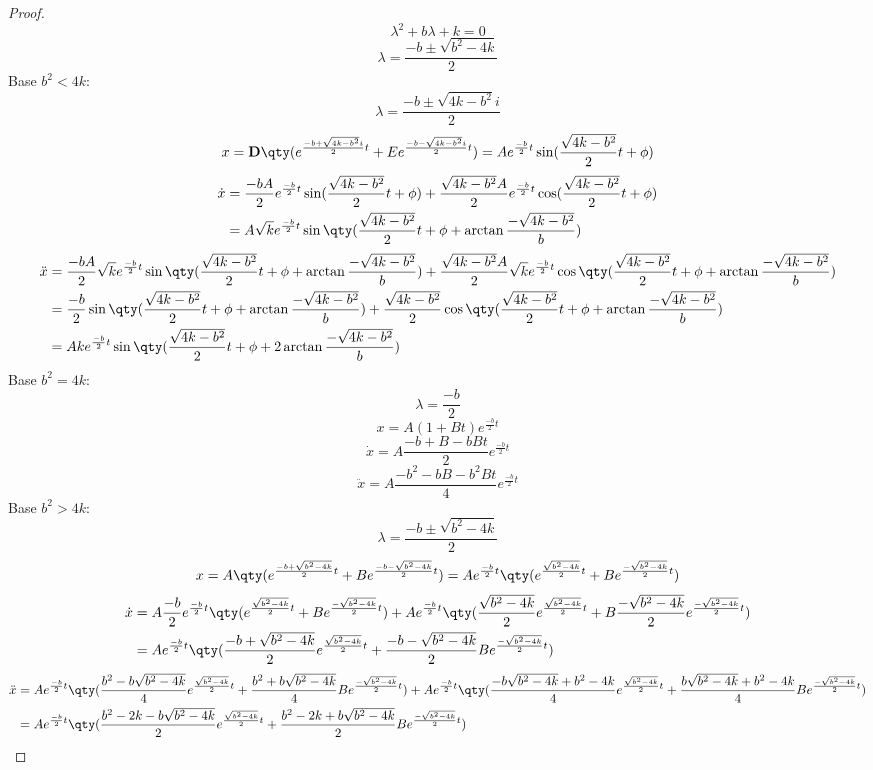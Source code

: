 \documentclass[a4paper,12pt]{article}
\begin{document}
\begin{proof}
\[\lambda^2+b\lambda+k=0\]
\[\lambda=\frac{-b\pm\sqrt{b^2-4k}}{2}\]
Base $b^2<4k$:
\[\lambda=\frac{-b\pm\sqrt{4k-b^2}i}{2}\]
\[x=\mathbf{D}\qty(e^{\frac{-b+\sqrt{4k-b^2}i}{2}t}+Ee^{\frac{-b-\sqrt{4k-b^2}i}{2}t})=Ae^{\frac{-b}{2}t}\sin(\frac{\sqrt{4k-b^2}}{2}t+\phi)\]
\[\begin{aligned}
\dot{x}&=\frac{-bA}{2}e^{\frac{-b}{2}t}\sin(\frac{\sqrt{4k-b^2}}{2}t+\phi)+\frac{\sqrt{4k-b^2}A}{2}e^{\frac{-b}{2}t}\cos(\frac{\sqrt{4k-b^2}}{2}t+\phi)\\
&=A\sqrt{k}e^{\frac{-b}{2}t}\sin\qty(\frac{\sqrt{4k-b^2}}{2}t+\phi+\arctan\frac{-\sqrt{4k-b^2}}{b})
\end{aligned}\]
\[\begin{aligned}
\ddot{x}&=\frac{-bA}{2}\sqrt{k}e^{\frac{-b}{2}t}\sin\qty(\frac{\sqrt{4k-b^2}}{2}t+\phi+\arctan\frac{-\sqrt{4k-b^2}}{b})+\frac{\sqrt{4k-b^2}A}{2}\sqrt{k}e^{\frac{-b}{2}t}\cos\qty(\frac{\sqrt{4k-b^2}}{2}t+\phi+\arctan\frac{-\sqrt{4k-b^2}}{b})\\
&=\frac{-b}{2}\sin\qty(\frac{\sqrt{4k-b^2}}{2}t+\phi+\arctan\frac{-\sqrt{4k-b^2}}{b})+\frac{\sqrt{4k-b^2}}{2}\cos\qty(\frac{\sqrt{4k-b^2}}{2}t+\phi+\arctan\frac{-\sqrt{4k-b^2}}{b})\\
&=Ake^{\frac{-b}{2}t}\sin\qty(\frac{\sqrt{4k-b^2}}{2}t+\phi+2\arctan\frac{-\sqrt{4k-b^2}}{b})
\end{aligned}\]
Base $b^2=4k$:
\[\lambda=\frac{-b}{2}\]
\[x=A(1+Bt)e^{\frac{-b}{2}t}\]
\[\dot{x}=A\frac{-b+B-bBt}{2}e^{\frac{-b}{2}t}\]
\[\ddot{x}=A\frac{-b^2-bB-b^2Bt}{4}e^{\frac{-b}{2}t}\]
Base $b^2>4k$:
\[\lambda=\frac{-b\pm\sqrt{b^2-4k}}{2}\]
\[x=A\qty(e^{\frac{-b+\sqrt{b^2-4k}}{2}t}+Be^{\frac{-b-\sqrt{b^2-4k}}{2}t})=Ae^{\frac{-b}{2}t}\qty(e^{\frac{\sqrt{b^2-4k}}{2}t}+Be^{\frac{-\sqrt{b^2-4k}}{2}t})\]
\[\begin{aligned}
\dot{x}&=A\frac{-b}{2}e^{\frac{-b}{2}t}\qty(e^{\frac{\sqrt{b^2-4k}}{2}t}+Be^{\frac{-\sqrt{b^2-4k}}{2}t})+Ae^{\frac{-b}{2}t}\qty(\frac{\sqrt{b^2-4k}}{2}e^{\frac{\sqrt{b^2-4k}}{2}t}+B\frac{-\sqrt{b^2-4k}}{2}e^{\frac{-\sqrt{b^2-4k}}{2}t})\\
&=Ae^{\frac{-b}{2}t}\qty(\frac{-b+\sqrt{b^2-4k}}{2}e^{\frac{\sqrt{b^2-4k}}{2}t}+\frac{-b-\sqrt{b^2-4k}}{2}Be^{\frac{-\sqrt{b^2-4k}}{2}t})
\end{aligned}\]
\[\begin{aligned}
\ddot{x}&=Ae^{\frac{-b}{2}t}\qty(\frac{b^2-b\sqrt{b^2-4k}}{4}e^{\frac{\sqrt{b^2-4k}}{2}t}+\frac{b^2+b\sqrt{b^2-4k}}{4}Be^{\frac{-\sqrt{b^2-4k}}{2}t})+Ae^{\frac{-b}{2}t}\qty(\frac{-b\sqrt{b^2-4k}+b^2-4k}{4}e^{\frac{\sqrt{b^2-4k}}{2}t}+\frac{b\sqrt{b^2-4k}+b^2-4k}{4}Be^{\frac{-\sqrt{b^2-4k}}{2}t})\\
&=Ae^{\frac{-b}{2}t}\qty(\frac{b^2-2k-b\sqrt{b^2-4k}}{2}e^{\frac{\sqrt{b^2-4k}}{2}t}+\frac{b^2-2k+b\sqrt{b^2-4k}}{2}Be^{\frac{-\sqrt{b^2-4k}}{2}t})
\end{aligned}\]
\end{proof}
\end{document}
